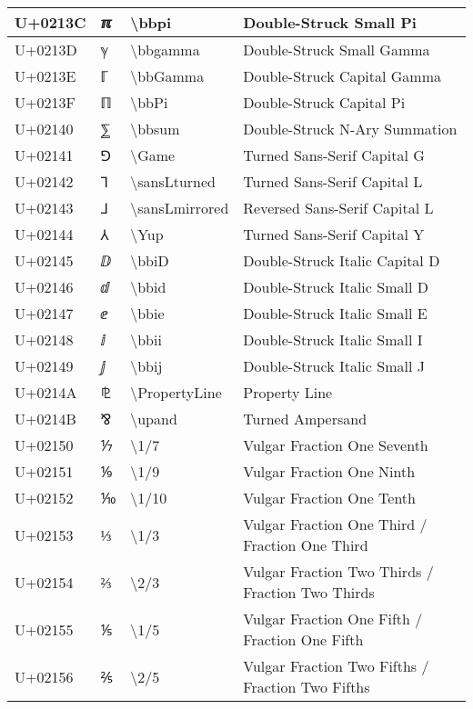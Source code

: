 \begin{table}[h]
\begin{tabulary}{\linewidth}{|L|L|L|L|}
\hline
U+0213C & ℼ & {\textbackslash}bbpi & Double-Struck Small Pi \\
\hline
U+0213D & ℽ & {\textbackslash}bbgamma & Double-Struck Small Gamma \\
\hline
U+0213E & ℾ & {\textbackslash}bbGamma & Double-Struck Capital Gamma \\
\hline
U+0213F & ℿ & {\textbackslash}bbPi & Double-Struck Capital Pi \\
\hline
U+02140 & ⅀ & {\textbackslash}bbsum & Double-Struck N-Ary Summation \\
\hline
U+02141 & ⅁ & {\textbackslash}Game & Turned Sans-Serif Capital G \\
\hline
U+02142 & ⅂ & {\textbackslash}sansLturned & Turned Sans-Serif Capital L \\
\hline
U+02143 & ⅃ & {\textbackslash}sansLmirrored & Reversed Sans-Serif Capital L \\
\hline
U+02144 & ⅄ & {\textbackslash}Yup & Turned Sans-Serif Capital Y \\
\hline
U+02145 & ⅅ & {\textbackslash}bbiD & Double-Struck Italic Capital D \\
\hline
U+02146 & ⅆ & {\textbackslash}bbid & Double-Struck Italic Small D \\
\hline
U+02147 & ⅇ & {\textbackslash}bbie & Double-Struck Italic Small E \\
\hline
U+02148 & ⅈ & {\textbackslash}bbii & Double-Struck Italic Small I \\
\hline
U+02149 & ⅉ & {\textbackslash}bbij & Double-Struck Italic Small J \\
\hline
U+0214A & ⅊ & {\textbackslash}PropertyLine & Property Line \\
\hline
U+0214B & ⅋ & {\textbackslash}upand & Turned Ampersand \\
\hline
U+02150 & ⅐ & {\textbackslash}1/7 & Vulgar Fraction One Seventh \\
\hline
U+02151 & ⅑ & {\textbackslash}1/9 & Vulgar Fraction One Ninth \\
\hline
U+02152 & ⅒ & {\textbackslash}1/10 & Vulgar Fraction One Tenth \\
\hline
U+02153 & ⅓ & {\textbackslash}1/3 & Vulgar Fraction One Third / Fraction One Third \\
\hline
U+02154 & ⅔ & {\textbackslash}2/3 & Vulgar Fraction Two Thirds / Fraction Two Thirds \\
\hline
U+02155 & ⅕ & {\textbackslash}1/5 & Vulgar Fraction One Fifth / Fraction One Fifth \\
\hline
U+02156 & ⅖ & {\textbackslash}2/5 & Vulgar Fraction Two Fifths / Fraction Two Fifths \\

\end{tabulary}
\end{table}
